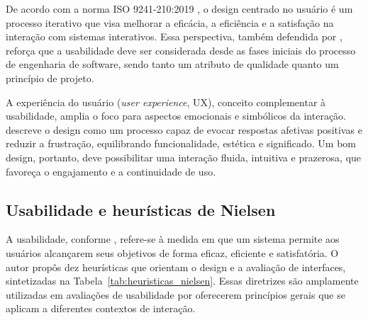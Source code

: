         De acordo com a norma ISO 9241-210:2019 \cite{ISO9241210}, o design centrado no usuário é um processo iterativo que visa melhorar a eficácia, a eficiência e a satisfação na interação com sistemas interativos. Essa perspectiva, também defendida por , reforça que a usabilidade deve ser considerada desde as fases iniciais do processo de engenharia de software, sendo tanto um atributo de qualidade quanto um princípio de projeto. 

        A experiência do usuário (\textit{user experience}, UX), conceito complementar à usabilidade, amplia o foco para aspectos emocionais e simbólicos da interação.  descreve o design como um processo capaz de evocar respostas afetivas positivas e reduzir a frustração, equilibrando funcionalidade, estética e significado. Um bom design, portanto, deve possibilitar uma interação fluida, intuitiva e prazerosa, que favoreça o engajamento e a continuidade de uso.

        \subsection{Usabilidade e heurísticas de Nielsen}

        A usabilidade, conforme , refere-se à medida em que um sistema permite aos usuários alcançarem seus objetivos de forma eficaz, eficiente e satisfatória. O autor propôs dez heurísticas que orientam o design e a avaliação de interfaces, sintetizadas na Tabela~\ref{tab:heuristicas_nielsen}. Essas diretrizes são amplamente utilizadas em avaliações de usabilidade por oferecerem princípios gerais que se aplicam a diferentes contextos de interação.

